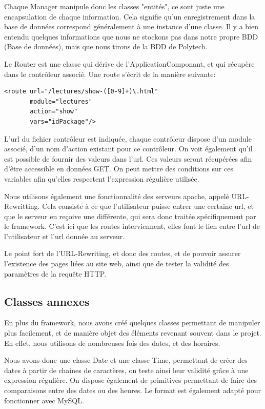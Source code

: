 Chaque Manager manipule donc les classes "entités", ce sont juste une encapsulation de chaque information. Cela signifie
qu'un enregistrement dans la base de données correspond généralement à une instance d'une classe. Il y a bien entendu quelques
informations que nous ne stockons pas dans notre propre BDD (Base de données), mais que nous tirons de la BDD de Polytech.

Le Router est une classe qui dérive de l'ApplicationComponant, et qui récupère dans le contrôleur associé.
Une route s'écrit de la manière suivante:

    \lstset{language=XML}
    \begin{lstlisting} 
<route url="/lectures/show-([0-9]+)\.html"
       module="lectures"
       action="show"
       vars="idPackage"/>
    \end{lstlisting}

L'url du fichier contrôleur est indiquée, chaque contrôleur dispose d'un module associé, d'un nom d'action existant pour ce
contrôleur. On voit également qu'il est possible de fournir des valeurs dans l'url. Ces valeurs seront récupérées afin
d'être accessible en données GET. On peut mettre des conditions sur ces variables afin qu'elles respectent l'expression régulière
utilisée.

Nous utilisons également une fonctionnalité des serveurs apache, appelé URL-Rewritting. Cela consiste à ce que l'utilisateur
puisse entrer une certaine url, et que le serveur en reçoive une différente, qui sera donc traitée spécifiquement par le framework.
C'est ici que les routes interviennent, elles font le lien entre l'url de l'utilisateur et l'url donnée au serveur.

Le point fort de l'URL-Rewriting, et donc des routes, et de pouvoir assurer l'existence des pages liées au site web,
ainsi que de tester la validité des paramètres de la requête HTTP.

        \subsection{Classes annexes}

En plus du framework, nous avons créé quelques classes permettant de manipuler plus facilement, et de manière objet
des éléments revenant souvent dans le projet. En effet, nous utilisons de nombreuses fois des dates, et des horaires.

Nous avons donc une classe Date et une classe Time, permettant de créer des dates à partir de chaines de caractères,
on teste ainsi leur validité grâce à une expression régulière. On dispose également de primitives permettant de
faire des comparaisons entre des dates ou des heures. Le format est également adapté pour fonctionner avec MySQL.

